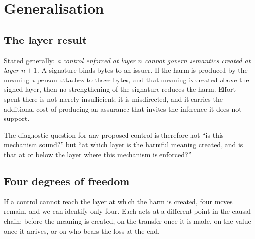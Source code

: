 \documentclass[10pt,a4paper,twocolumn]{article}
\begin{document}
\section{Generalisation}
\label{sec:general}

\subsection{The layer result}

Stated generally: \emph{a control enforced at layer $n$ cannot govern semantics
created at layer $n+1$.} A signature binds bytes to an issuer. If the harm is
produced by the meaning a person attaches to those bytes, and that meaning is
created above the signed layer, then no strengthening of the signature reduces
the harm. Effort spent there is not merely insufficient; it is misdirected, and
it carries the additional cost of producing an assurance that invites the
inference it does not support.

The diagnostic question for any proposed control is therefore not ``is this
mechanism sound?'' but ``at which layer is the harmful meaning created, and is
that at or below the layer where this mechanism is enforced?''

\subsection{Four degrees of freedom}
\label{sec:degrees}

If a control cannot reach the layer at which the harm is created, four moves
remain, and we can identify only four. Each acts at a different point in the
causal chain: before the meaning is created, on the transfer once it is made, on
the value once it arrives, or on who bears the loss at the end.
\end{document}
